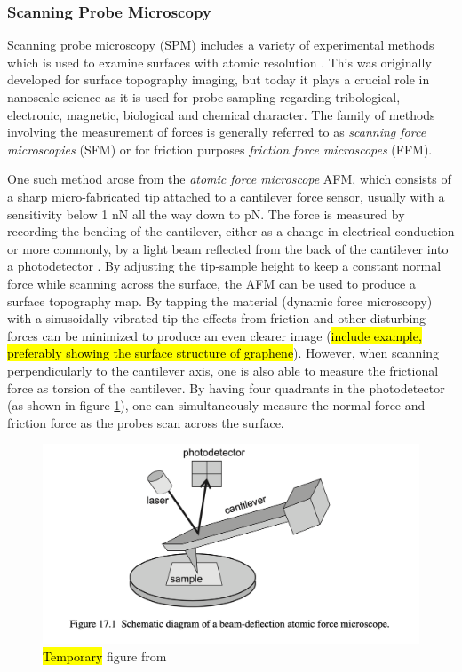 \subsubsection{Scanning Probe Microscopy}\label{sec:SPM} Scanning probe
microscopy (\acrshort{SPM}) includes a variety of experimental methods which is
used to examine surfaces with atomic resolution \cite[pp.
6-27]{BHUSHAN20051507}. This was originally developed for surface topography
imaging, but today it plays a crucial role in nanoscale science as it is used
for probe-sampling regarding tribological, electronic, magnetic, biological and
chemical character. The family of methods involving the measurement of forces is
generally referred to as \textit{scanning force microscopies} (\acrshort{SFM})
or for friction purposes \textit{friction force microscopes} (\acrshort{FFM}).

One such method arose from the \textit{atomic force microscope} \acrshort{AFM}, which consists of a sharp micro-fabricated tip attached to a cantilever force sensor, usually with a sensitivity below 1 nN all the way down to pN. The force is measured by recording the bending of
the cantilever, either as a change in electrical conduction or more commonly, by
a light beam reflected from the back of the cantilever into a photodetector
\cite[p. 183]{gnecco_meyer_2015}. By adjusting the tip-sample height to keep a constant normal force while scanning across the surface, the \acrshort{AFM} can be used to produce a
surface topography map. By tapping the material (dynamic force microscopy) with
a sinusoidally vibrated tip the effects from friction and other disturbing forces
can be minimized to produce an even clearer image (\hl{include example,
preferably showing the surface structure of graphene}). However, when scanning
perpendicularly to the cantilever axis, one is also able to measure the
frictional force as torsion of the cantilever. By having four quadrants in the
photodetector (as shown in figure \cref{fig:AFM}), one can simultaneously
measure the normal force and friction force as the probes scan across the
surface. 

\begin{figure}[H]
  \centering
  \includegraphics[width=0.6\linewidth]{figures/theory/AFM.png}
  \caption{\hl{Temporary} figure from \cite[p. 184]{gnecco_meyer_2015}}
  \label{fig:AFM}
\end{figure}


